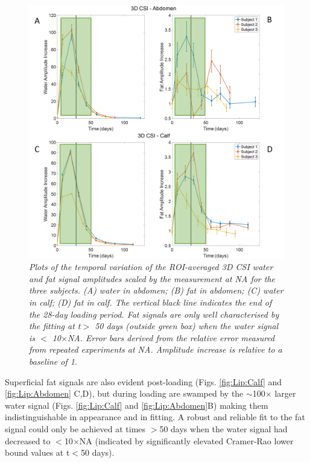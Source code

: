 \begin{figure}
    \centering
    \includegraphics[width=1\textwidth]{Figures/Lipid/3DCSI_Amplitude.png}
    \caption{\textit{Plots of the temporal variation of the \ac{ROI}-averaged 3D \ac{CSI} water and fat signal amplitudes scaled by the measurement at \ac{NA} for the three subjects. (A) water in abdomen; (B) fat in abdomen; (C) water in calf; (D) fat in calf. The vertical black line indicates the end of the 28-day loading period. Fat signals are only well characterised by the fitting at t$>$ 50 days (outside green box) when the water signal is $<$ 10}$\times$\textit{\ac{NA}.  Error bars derived from the relative error measured from repeated experiments at NA. Amplitude increase is relative to a baseline of 1.}}
    \label{fig:Lip:3DCSI}
\end{figure}

Superficial fat signals are also evident post-loading (Figs. \ref{fig:Lip:Calf} and \ref{fig:Lip:Abdomen} C,D), but during loading are swamped by the $\sim$100$\times$ larger water signal (Figs. \ref{fig:Lip:Calf} and \ref{fig:Lip:Abdomen}B) making them indistinguishable in appearance and in fitting. A robust and reliable fit to the fat signal could only be achieved at times $>$50 days when the water signal had decreased to $<$10$\times$\ac{NA} (indicated by significantly elevated Cramer-Rao lower bound values at t$<$50 days).

